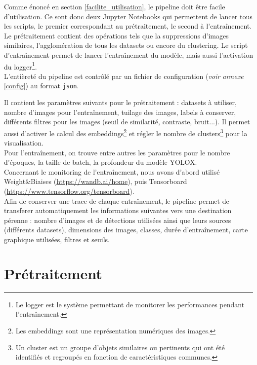 Comme énoncé en section \ref{facilite_utilisation}, le pipeline doit être facile d'utilisation. 
Ce sont donc deux Jupyter Notebooks qui permettent de lancer tous les scripts, le premier correspondant
au prétraitement, le second à l'entraînement. Le prétraitement contient des opérations tels que 
la suppressions d'images similaires, l'agglomération de tous les datasets ou encore du clustering. 
Le script d'entraînement permet de lancer l'entraînement du modèle, mais aussi l'activation du 
logger\footnote{Le logger est le système permettant de monitorer les performances pendant l'entraînement.}.\\


L'entièreté du pipeline est contrôlé par un fichier de configuration (\textit{voir annexe} \ref{config}) 
au format \texttt{json}. 

Il contient les paramètres suivants pour le prétraitement : datasets à utiliser, nombre d'images pour 
l'entraînement, tuilage des images, labels à conserver, différents filtres pour les images (seuil de 
similarité, contraste, bruit...). Il permet aussi d'activer le calcul des embeddings\footnote{
Les embeddings sont une représentation numériques des images.} 
et régler le nombre de clusters\footnote{Un cluster est un groupe d'objets similaires ou pertinents 
qui ont été identifiés et regroupés en fonction de caractéristiques communes.} pour la visualisation.\\

Pour l'entraînement, on trouve entre autres les paramètres pour le nombre d'époques, la taille de batch, 
la profondeur du modèle YOLOX.\\

Concernant le monitoring de l'entraînement, nous avons d'abord utilisé Weight\&Biaises
(\url{https://wandb.ai/home}), puis Tensorboard (\url{https://www.tensorflow.org/tensorboard}). \\

Afin de conserver une trace de chaque entraînement, le pipeline permet de transferer automatiquement 
les informations suivantes vers une destination pérenne : nombre d'images et de détections utilisées
ainsi que leurs sources (différents datasets), dimensions des images, classes, durée d'entraînement, 
carte graphique utilisées, filtres et seuils. \\

\section{Prétraitement}

